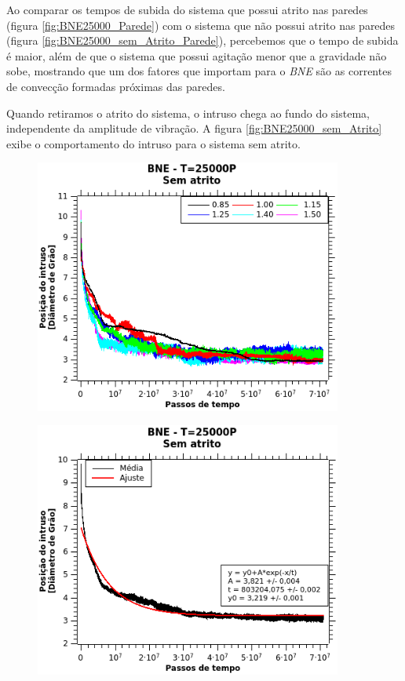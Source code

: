     Ao comparar os tempos de subida do sistema que possui atrito nas paredes (figura \ref{fig:BNE25000_Parede}) com o sistema que não possui atrito nas paredes (figura \ref{fig:BNE25000_sem_Atrito_Parede}), percebemos que o tempo de subida é maior, além de que o sistema que possui agitação menor que a gravidade não sobe, mostrando que um dos fatores que importam para o \textit{BNE} são as correntes de convecção formadas próximas das paredes.

    Quando retiramos o atrito do sistema, o intruso chega ao fundo do sistema, independente da amplitude de vibração. A figura \ref{fig:BNE25000_sem_Atrito} exibe o comportamento do intruso para o sistema sem atrito.

\begin{figure}
    \centering
    \begin{minipage}{.45\linewidth}
        \includegraphics[width=0.9\textwidth]{04-figuras/BNE25000semAtrito.png}
        \label{fig:BNE25000_sem_Atrito_Sistema}
    \end{minipage}
    \begin{minipage}{.45\linewidth}
        \includegraphics[width=0.9\textwidth]{04-figuras/BNE25000semAtrito_Ajuste.png}

\end{minipage}
\end{figure}
